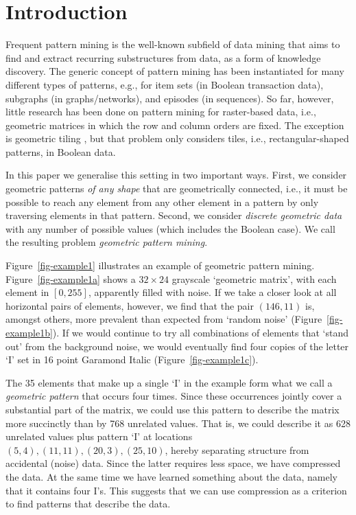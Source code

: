 \documentclass{llncs}
\begin{document}
\section{Introduction}

Frequent pattern mining \cite{fpmbook2014} is the well-known subfield of data mining that aims to find and extract recurring substructures from data, as a form of knowledge discovery. The generic concept of pattern mining has been instantiated for many different types of patterns, e.g., for item sets (in Boolean transaction data), subgraphs (in graphs/networks), and episodes (in sequences). So far, however, little research has been done on pattern mining for raster-based data, i.e., geometric matrices in which the row and column orders are fixed. The exception is geometric tiling \cite{gionis2004,tatti2012}, but that problem only considers tiles, i.e., rectangular-shaped patterns, in Boolean data.

In this paper we generalise this setting in two important ways. First, we consider geometric patterns \emph{of any shape} that are geometrically connected, i.e., it must be possible to reach any element from any other element in a pattern by only traversing elements in that pattern. Second, we consider \emph{discrete geometric data} with any number of possible values (which includes the Boolean case). We call the resulting problem \emph{geometric pattern mining}.

Figure~\ref{fig-example1} illustrates an example of geometric pattern mining.  Figure~\ref{fig-example1a} shows a $32 \times 24$ grayscale `geometric matrix', with each element in $[0,255]$, apparently filled with noise. If we take a closer look at all horizontal pairs of elements, however, we find that the pair $(146,11)$ is, amongst others, more prevalent than expected from `random noise' (Figure~\ref{fig-example1b}). If we would continue to try all combinations of elements that `stand out' from the background noise, we would eventually find four copies of the letter `I' set in 16 point Garamond Italic (Figure~\ref{fig-example1c}).

The 35 elements that make up a single `I' in the example form what we call a \emph{geometric pattern} that occurs four times. Since these occurrences jointly cover a substantial part of the matrix, we could use this pattern to describe the matrix more succinctly than by 768 unrelated values. That is, we could describe it as 628 unrelated values plus pattern `I' at locations $(5,4), (11,11), (20,3), (25,10)$, hereby separating structure from accidental (noise) data. Since the latter requires less space, we have compressed the data. At the same time we have learned something about the data, namely that it contains four I's. This suggests that we can use compression as a criterion to find patterns that describe the data.
\end{document}
